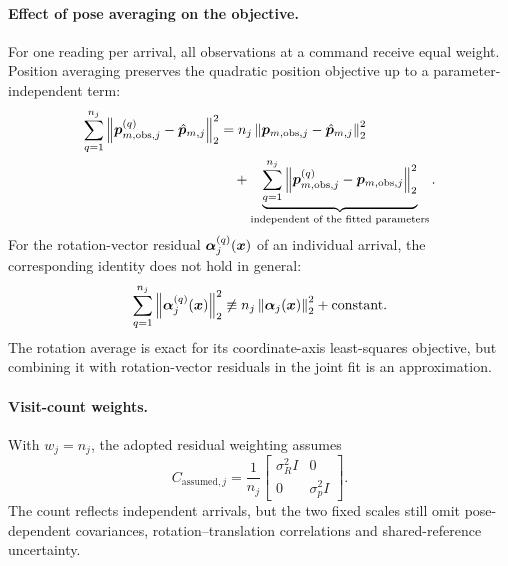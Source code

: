 \documentclass[../main.tex]{subfiles}
\begin{document}
\paragraph{Effect of pose averaging on the objective.}
For one reading per arrival, all observations at a command receive equal weight. Position averaging preserves the quadratic position objective up to a parameter-independent term:
\begin{equation*}
\begin{aligned}
\sum_{q=1}^{n_j}\left\|\bm{p}_{m,\mathrm{obs},j}^{(q)}-\hat{\bm{p}}_{m,j}\right\|_2^2
&=n_j\left\|\bm{p}_{m,\mathrm{obs},j}-\hat{\bm{p}}_{m,j}\right\|_2^2\\
&\quad+\underbrace{\sum_{q=1}^{n_j}\left\|\bm{p}_{m,\mathrm{obs},j}^{(q)}-\bm{p}_{m,\mathrm{obs},j}\right\|_2^2}_{\text{independent of the fitted parameters}}.
\end{aligned}
\end{equation*}
For the rotation-vector residual $\bm{\alpha}_j^{(q)}(\bm{x})$ of an individual arrival, the corresponding identity does not hold in general:
\begin{equation*}
\sum_{q=1}^{n_j}\left\|\bm{\alpha}_j^{(q)}(\bm{x})\right\|_2^2
\not\equiv n_j\left\|\bm{\alpha}_j(\bm{x})\right\|_2^2+\text{constant}.
\end{equation*}
The rotation average is exact for its coordinate-axis least-squares objective, but combining it with rotation-vector residuals in the joint fit is an approximation.

\paragraph{Visit-count weights.}
With $w_j=n_j$, the adopted residual weighting assumes
\begin{equation*}
C_{\mathrm{assumed},j}=\frac1{n_j}
\begin{bmatrix}\sigma_R^2I&0\\0&\sigma_p^2I\end{bmatrix}.
\end{equation*}
The count reflects independent arrivals, but the two fixed scales still omit pose-dependent covariances, rotation--translation correlations and shared-reference uncertainty.
\end{document}
